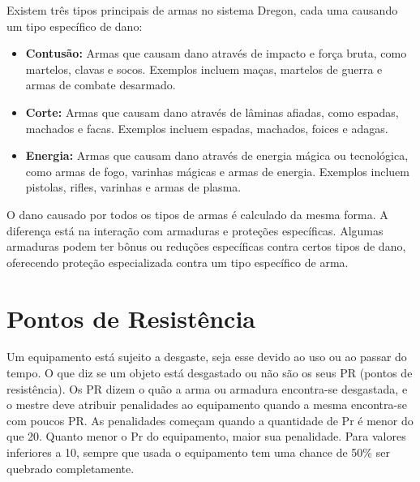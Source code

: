 Existem três tipos principais de armas no sistema Dregon, cada uma causando um tipo específico de dano:

\begin{itemize}
	\item \textbf{Contusão:} Armas que causam dano através de impacto e força bruta, como martelos, clavas e socos. Exemplos incluem maças, martelos de guerra e armas de combate desarmado.
	
	\item \textbf{Corte:} Armas que causam dano através de lâminas afiadas, como espadas, machados e facas. Exemplos incluem espadas, machados, foices e adagas.
	
	\item \textbf{Energia:} Armas que causam dano através de energia mágica ou tecnológica, como armas de fogo, varinhas mágicas e armas de energia. Exemplos incluem pistolas, rifles, varinhas e armas de plasma.
\end{itemize}

O dano causado por todos os tipos de armas é calculado da mesma forma. A diferença está na interação com armaduras e proteções específicas. Algumas armaduras podem ter bônus ou reduções específicas contra certos tipos de dano, oferecendo proteção especializada contra um tipo específico de arma.

\section{Pontos de Resistência}

Um equipamento está sujeito a desgaste, seja esse devido ao uso ou ao passar do tempo. O que diz se um objeto está desgastado ou não são os seus PR (pontos de resistência). Os PR dizem o quão a arma ou armadura encontra-se desgastada, e o mestre deve atribuir penalidades ao equipamento quando a mesma encontra-se com poucos PR. As penalidades começam quando a quantidade de Pr é menor do que 20. Quanto menor o Pr do equipamento, maior sua penalidade. Para valores inferiores a 10, sempre que usada o equipamento tem uma chance de 50\% ser quebrado completamente.


